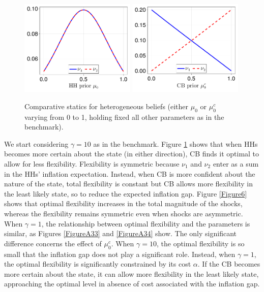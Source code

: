 \documentclass[12pt,a4paper]{article}
\begin{document}
\begin{figure}[h!]
\centering
\includegraphics[width=0.49\textwidth]{figures/V11/γ=10.0-μ_0=0.5-α=1.0-θ=1.0-δ=0.5-ω_1=1.0-ω_2=-1.0/flexibility/fig_optimal_ν_by_μ_0.pdf}
\includegraphics[width=0.49\textwidth]{figures/V11/γ=10.0-μ_0=0.5-α=1.0-θ=1.0-δ=0.5-ω_1=1.0-ω_2=-1.0/flexibility/fig_optimal_ν_by_μ_0_c.pdf}
\caption{Comparative statics for heterogeneous beliefs (either $\mu_0$ or $\mu_0^c$ varying from 0 to 1, holding fixed all other parameters as in the benchmark).}
\label{Figure5}
\end{figure}

We start considering $\gamma=10$ as in the benchmark. Figure \ref{Figure5} shows that when HHs becomes more certain about the state (in either direction), CB finds it optimal to allow for less flexibility. Flexibility is symmetric because $\nu_1$ and $\nu_2$ enter as a sum in the HHs' inflation expectation. Instead, when CB is more confident about the nature of the state, total flexibility is constant but CB allows more flexibility in the least likely state, so to reduce the expected inflation gap. Figure \ref{Figure6} shows that optimal flexibility increases in the total magnitude of the shocks, whereas the flexibility remains symmetric even when shocks are asymmetric. When $\gamma=1$, the relationship between optimal flexibility and the parameters is similar, as Figures \ref{FigureA33} and \ref{FigureA34} show. The only significant difference concerns the effect of $\mu_0^c$. When $\gamma=10$, the optimal flexibility is so small that the inflation gap does not play a significant role. Instead, when $\gamma=1$, the optimal flexibility is significantly constrained by its cost $\alpha$. If the CB becomes more certain about the state, it can allow more flexibility in the least likely state, approaching the optimal level in absence of cost associated with the inflation gap.
\end{document}
